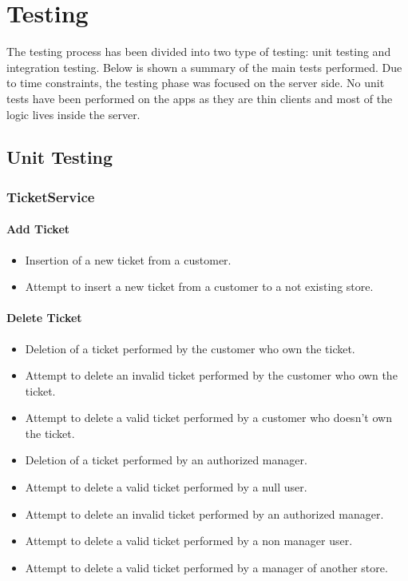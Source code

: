 \chapter{Testing}
The testing process has been divided into two type of testing: unit testing and integration testing. Below is shown a summary of the main tests performed.\newline
Due to time constraints, the testing phase was focused on the server side.\newline
No unit tests have been performed on the apps as they are thin clients and most of the logic lives inside the server. 

\section{Unit Testing}

\subsection{TicketService}
\subsubsection{Add Ticket}
\begin{itemize}
	\item Insertion of a new ticket from a customer.
	\item Attempt to insert a new ticket from a customer to a not existing store.
\end{itemize}

\subsubsection{Delete Ticket}
\begin{itemize}
	\item Deletion of a ticket performed by the customer who own the ticket.
	\item Attempt to delete an invalid ticket performed by the customer who own the ticket.
	\item Attempt to delete a valid ticket performed by a customer who doesn't own the ticket.
	\item Deletion of a ticket performed by an authorized manager.
	\item Attempt to delete a valid ticket performed by a null user.
	\item Attempt to delete an invalid ticket performed by an authorized manager.
	\item Attempt to delete a valid ticket performed by a non manager user.
	\item Attempt to delete a valid ticket performed by a manager of another store.
\end{itemize}

